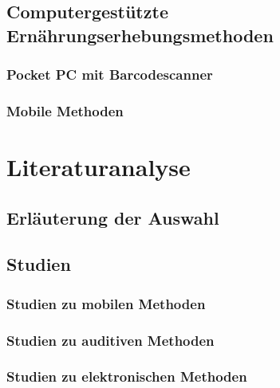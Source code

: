 \subsection{Computergestützte Ernährungserhebungsmethoden}

\subsubsection{Pocket PC mit Barcodescanner}

\subsubsection{Mobile Methoden}

\section{Literaturanalyse}

\subsection{Erläuterung der Auswahl}

\subsection{Studien}
\subsubsection{Studien zu mobilen Methoden}
\subsubsection{Studien zu auditiven Methoden}
\subsubsection{Studien zu elektronischen Methoden}




